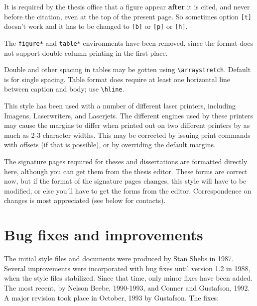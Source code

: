 It is required by the thesis office that a figure appear {\bf after} it
is cited, and never before the citation, even at the top of the present
page. So sometimes option \verb"[t]" doesn't work and it has to be
changed to \verb"[b]" or \verb"[p]" or \verb"[h]".

The \verb|figure*| and \verb|table*| environments have been removed,
since the format does not support double column printing in the first place.

Double and other spacing in tables may be gotten using \verb|\arraystretch|.
Default is for single spacing.  Table format does require at least one
horizontal line between caption and body; use \verb|\hline|.

This style has been used with a number of different laser printers,
including Imagens, Laserwriters, and Laserjets.
The different engines used by
these printers may cause the margins to differ when printed out on
two different printers by as much as 2-3 character widths. This may be
corrected by issuing print commands with offsets (if that is
possible), or by overriding the default margins.

The signature pages required for theses and dissertations are formatted
directly here, although you can get them from the thesis editor. These
forms are correct now, but if the format of the signature pages changes,
this style will have to be modified, or else you'll have to get the
forms from the editor. Correspondence on changes is most appreciated
(see below for contacts).

\section{Bug fixes and improvements}
The initial style files and documents were produced by Stan Shebs in
1987. Several improvements were incorporated with bug fixes until
version 1.2 in 1988, when the style files stabilized. Since that time,
only minor fixes have been added. The most recent, by Nelson Beebe,
1990-1993, and Conner and Gustafson, 1992. A major revision took place
in October, 1993 by Gustafson. The fixes:

